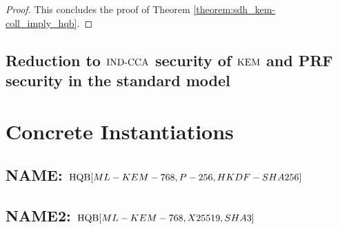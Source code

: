 \documentclass{article}
\begin{document}
\begin{proof}
                                                                                                    \item This concludes the proof of Theorem \ref{theorem:sdh_kem-coll_imply_hqb}.

                                                                                                    \end{proof}




                                                                                                    \subsection{Reduction to $\text{IND-CCA}$ security of $\text{KEM}$ and PRF security in the standard model}



                                                                                                    \section{Concrete Instantiations}\label{sec:concrete}

                                                                                                    \subsection{NAME: $\text{HQB}[ML-KEM-768, P-256, HKDF-SHA256]$}


                                                                                                    \subsection{NAME2: $\text{HQB}[ML-KEM-768, X25519, SHA3]$}

\end{document}
